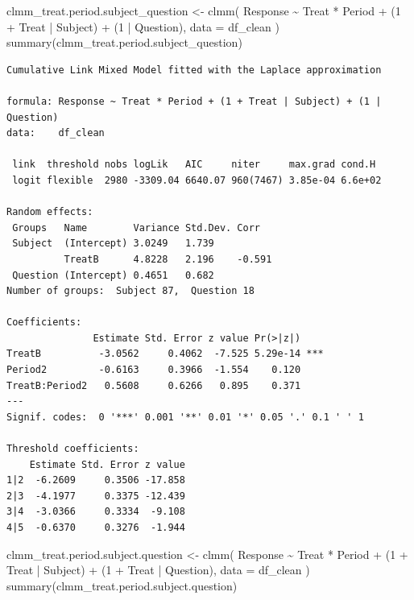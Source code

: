 \documentclass[
  12pt,
  a4paper,
  extrafontsizes,
  onecolumn,
  openright]{memoir}
\newenvironment{Shaded}{\begin{snugshade}}{\end{snugshade}}
\newcommand{\AttributeTok}[1]{\textcolor[rgb]{0.40,0.45,0.13}{#1}}
\newcommand{\DecValTok}[1]{\textcolor[rgb]{0.68,0.00,0.00}{#1}}
\newcommand{\FunctionTok}[1]{\textcolor[rgb]{0.28,0.35,0.67}{#1}}
\newcommand{\NormalTok}[1]{\textcolor[rgb]{0.00,0.23,0.31}{#1}}
\newcommand{\OtherTok}[1]{\textcolor[rgb]{0.00,0.23,0.31}{#1}}
\newcommand{\SpecialCharTok}[1]{\textcolor[rgb]{0.37,0.37,0.37}{#1}}
\begin{document}
\scriptsize

\begin{Shaded}
\begin{Highlighting}[]
\NormalTok{clmm\_treat.period.subject\_question }\OtherTok{\textless{}{-}} \FunctionTok{clmm}\NormalTok{(}
\NormalTok{    Response }\SpecialCharTok{\textasciitilde{}}\NormalTok{ Treat }\SpecialCharTok{*}\NormalTok{ Period }\SpecialCharTok{+}\NormalTok{ (}\DecValTok{1} \SpecialCharTok{+}\NormalTok{ Treat }\SpecialCharTok{|}\NormalTok{ Subject) }\SpecialCharTok{+}\NormalTok{ (}\DecValTok{1} \SpecialCharTok{|}\NormalTok{ Question),}
    \AttributeTok{data =}\NormalTok{ df\_clean}
\NormalTok{)}
\FunctionTok{summary}\NormalTok{(clmm\_treat.period.subject\_question)}
\end{Highlighting}
\end{Shaded}

\begin{verbatim}
Cumulative Link Mixed Model fitted with the Laplace approximation

formula: Response ~ Treat * Period + (1 + Treat | Subject) + (1 | Question)
data:    df_clean

 link  threshold nobs logLik   AIC     niter     max.grad cond.H 
 logit flexible  2980 -3309.04 6640.07 960(7467) 3.85e-04 6.6e+02

Random effects:
 Groups   Name        Variance Std.Dev. Corr   
 Subject  (Intercept) 3.0249   1.739           
          TreatB      4.8228   2.196    -0.591 
 Question (Intercept) 0.4651   0.682           
Number of groups:  Subject 87,  Question 18 

Coefficients:
               Estimate Std. Error z value Pr(>|z|)    
TreatB          -3.0562     0.4062  -7.525 5.29e-14 ***
Period2         -0.6163     0.3966  -1.554    0.120    
TreatB:Period2   0.5608     0.6266   0.895    0.371    
---
Signif. codes:  0 '***' 0.001 '**' 0.01 '*' 0.05 '.' 0.1 ' ' 1

Threshold coefficients:
    Estimate Std. Error z value
1|2  -6.2609     0.3506 -17.858
2|3  -4.1977     0.3375 -12.439
3|4  -3.0366     0.3334  -9.108
4|5  -0.6370     0.3276  -1.944
\end{verbatim}

\begin{Shaded}
\begin{Highlighting}[]
\NormalTok{clmm\_treat.period.subject.question }\OtherTok{\textless{}{-}} \FunctionTok{clmm}\NormalTok{(}
\NormalTok{    Response }\SpecialCharTok{\textasciitilde{}}\NormalTok{ Treat }\SpecialCharTok{*}\NormalTok{ Period }\SpecialCharTok{+}\NormalTok{ (}\DecValTok{1} \SpecialCharTok{+}\NormalTok{ Treat }\SpecialCharTok{|}\NormalTok{ Subject) }\SpecialCharTok{+}\NormalTok{ (}\DecValTok{1} \SpecialCharTok{+}\NormalTok{ Treat }\SpecialCharTok{|}\NormalTok{ Question),}
    \AttributeTok{data =}\NormalTok{ df\_clean}
\NormalTok{)}
\FunctionTok{summary}\NormalTok{(clmm\_treat.period.subject.question)}
\end{Highlighting}
\end{Shaded}
\end{document}
